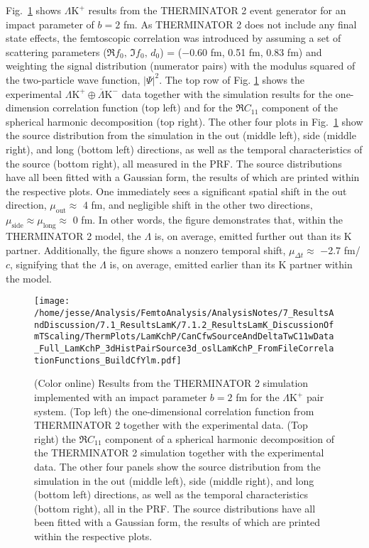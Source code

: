 \documentclass[ALICE,manyauthors]{cernphprep}
\newcommand{\Lam}{$\Lambda$\xspace}
\newcommand{\LamKchP}{$\Lambda\mathrm{K^{+}}$\xspace}
\begin{document}
Fig.\ \ref{fig:LamKchP_StdThermSources} shows \LamKchP results from the THERMINATOR 2 event generator for an impact parameter of $b = 2$ fm.
As THERMINATOR 2 does not include any final state effects, the femtoscopic correlation was introduced by assuming a set of scattering parameters ($\Re f_{0},\, \Im f_{0},\, d_{0}$) = ($-$0.60 fm, 0.51 fm, 0.83 fm) and weighting the signal distribution (numerator pairs) with the modulus squared of the two-particle wave function, $|\Psi|^{2}$.
The top row of Fig. \ref{fig:LamKchP_StdThermSources} shows the experimental $\Lambda\mathrm{K}^{+}\oplus\overline{\Lambda}\mathrm{K}^{-}$ data together with the simulation results for the one-dimension correlation function (top left) and for the $\Re C_{11}$ component of the spherical harmonic decomposition (top right).
The other four plots in Fig.\ \ref{fig:LamKchP_StdThermSources} show the source distribution from the simulation in the out (middle left), side (middle right), and long (bottom left) directions, as well as the temporal characteristics of the source (bottom right), all measured in the PRF.
The source distributions have all been fitted with a Gaussian form, the results of which are printed within the respective plots.
One immediately sees a significant spatial shift in the out direction, $\mu_{\mathrm{out}} \approx$ 4 fm, and negligible shift in the other two directions, $\mu_{\mathrm{side}} \approx \mu_{\mathrm{long}} \approx$ 0 fm.
In other words, the figure demonstrates that, within the THERMINATOR 2 model, the \Lam is, on average, emitted further out than its K partner.
Additionally, the figure shows a nonzero temporal shift, $\mu_{\Delta t} \approx$ $-$2.7 fm/$c$, signifying that the \Lam is, on average, emitted earlier than its K partner within the model. 


\begin{figure}[h!]
  \centering
  \texttt{[image: /home/jesse/Analysis/FemtoAnalysis/AnalysisNotes/7\_ResultsAndDiscussion/7.1\_ResultsLamK/7.1.2\_ResultsLamK\_DiscussionOfmTScaling/ThermPlots/LamKchP/CanCfwSourceAndDeltaTwC11wData\_Full\_LamKchP\_3dHistPairSource3d\_oslLamKchP\_FromFileCorrelationFunctions\_BuildCfYlm.pdf]}
  \caption[THERMINATOR 2 simulatin for \LamKchP]
  {
  {\color{blue}{UPDATED FIGURE}}
  (Color online) Results from the THERMINATOR 2 simulation implemented with an impact parameter $b = 2$ fm for the \LamKchP pair system.
  (Top left) the one-dimensional correlation function from THERMINATOR 2 together with the experimental data.
  (Top right) the $\Re C_{11}$ component of a spherical harmonic decomposition of the THERMINATOR 2 simulation together with the experimental data.
  The other four panels show the source distribution from the simulation in the out (middle left), side (middle right), and long (bottom left) directions, as well as the temporal characteristics (bottom right), all in the PRF.
  The source distributions have all been fitted with a Gaussian form, the results of which are printed within the respective plots.
  }
  \label{fig:LamKchP_StdThermSources}
\end{figure}
\end{document}
